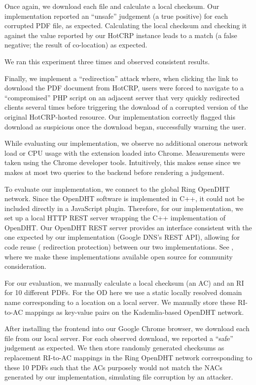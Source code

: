 Once again, we download each file and calculate a local checksum. Our
implementation reported an ``unsafe'' judgement (a true positive) for each
corrupted PDF file, as expected. Calculating the local checksum and checking it
against the value reported by our HotCRP instance leads to a match (a false
negative; \ie the result of co-location) as expected.

We ran this experiment three times and observed consistent results.

Finally, we implement a ``redirection'' attack where, when clicking the link to
download the PDF document from HotCRP, users were forced to navigate to a
``compromised'' PHP script on an adjacent server that very quickly redirected
clients several times before triggering the download of a corrupted version of
the original HotCRP-hosted resource. Our implementation correctly flagged this
download as suspicious once the download began, successfully warning the user.

While evaluating our implementation, we observe no additional onerous network
load or CPU usage with the extension loaded into Chrome. Measurements were taken
using the Chrome developer tools. Intuitively, this makes sense since we makes
at most two queries to the backend before rendering a judgement.

To evaluate our implementation, we connect to the global Ring OpenDHT network.
Since the OpenDHT software is implemented in C++, it could not be included
directly in a JavaScript plugin. Therefore, for our implementation, we set up a
local HTTP REST server wrapping the C++ implementation of OpenDHT. Our OpenDHT
REST server provides an interface consistent with the one expected by our
implementation (\ie Google DNS's REST API), allowing for code reuse (\eg
redirection protection) between our two implementations. See
, where we make these implementations available open source
for community consideration.

For our evaluation, we manually calculate a local checksum (\ie an AC) and an RI
for 10 different \CONFERENCE{} PDFs. For the OD here we use a static locally
resolved domain name corresponding to a location on a local server. We manually
store these RI-to-AC mappings as key-value pairs on the Kademlia-based OpenDHT
network.

After installing the frontend into our Google Chrome browser, we download each
file from our local server. For each observed download, we reported a ``safe''
judgement as expected. We then store randomly generated checksums as replacement
RI-to-AC mappings in the Ring OpenDHT network corresponding to these 10 PDFs
such that the ACs purposely would not match the NACs generated by our
implementation, simulating file corruption by an attacker.

